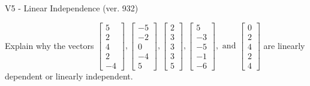 \begin{exercise}
  \begin{exerciseTitle}V5 - Linear Independence (ver. 932)\end{exerciseTitle}
  \begin{exerciseStatement}
    Explain why the vectors \(\left[\begin{array}{r}
5 \\
2 \\
4 \\
2 \\
-4
\end{array}\right] , \left[\begin{array}{r}
-5 \\
-2 \\
0 \\
-4 \\
5
\end{array}\right] , \left[\begin{array}{r}
2 \\
3 \\
3 \\
3 \\
5
\end{array}\right] , \left[\begin{array}{r}
5 \\
-3 \\
-5 \\
-1 \\
-6
\end{array}\right] , \text{ and } \left[\begin{array}{r}
0 \\
2 \\
4 \\
2 \\
4
\end{array}\right]\) are linearly dependent or linearly independent.	



\end{exerciseStatement}
\end{exercise}

